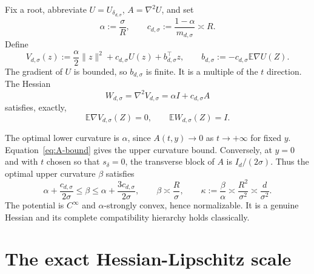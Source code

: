 \documentclass[11pt]{article}
\numberwithin{equation}{section}
\newcommand{\E}{\mathbb E}
\begin{document}
Fix a root, abbreviate $U=U_{\delta_{d,\sigma}}$, $A=\nabla^2U$, and set
\begin{equation}\label{eq:alpha-c}
 \alpha:=\frac\sigma R,\qquad
 c_{d,\sigma}:=\frac{1-\alpha}{m_{d,\sigma}}\asymp R.
\end{equation}
Define
\begin{equation}\label{eq:Vdef}
 V_{d,\sigma}(z)
 :=\frac\alpha2\|z\|^2+c_{d,\sigma}U(z)+b_{d,\sigma}^\top z,
 \qquad
 b_{d,\sigma}:=-c_{d,\sigma}\E\nabla U(Z).
\end{equation}
The gradient of $U$ is bounded, so $b_{d,\sigma}$ is finite.  It is a
multiple of the $t$ direction.  The Hessian
\begin{equation}\label{eq:Wdef}
 W_{d,\sigma}=\nabla^2V_{d,\sigma}=\alpha I+c_{d,\sigma}A
\end{equation}
satisfies, exactly,
\begin{equation}\label{eq:exact-equilibrium}
 \E\nabla V_{d,\sigma}(Z)=0,\qquad \E W_{d,\sigma}(Z)=I.
\end{equation}

The optimal lower curvature is $\alpha$, since $A(t,y)\to0$ as
$t\to+\infty$ for fixed $y$.  Equation~\eqref{eq:A-bound} gives the upper
curvature bound.  Conversely, at $y=0$ and with $t$ chosen so that
$s_\delta=0$, the transverse block of $A$ is $I_d/(2\sigma)$.  Thus the
optimal upper curvature $\beta$ satisfies
\begin{equation}\label{eq:beta-kappa}
 \alpha+\frac{c_{d,\sigma}}{2\sigma}\le\beta
 \le\alpha+\frac{3c_{d,\sigma}}{2\sigma},\qquad
 \beta\asymp\frac R\sigma,\qquad
 \kappa:=\frac\beta\alpha\asymp\frac{R^2}{\sigma^2}\asymp\frac d{\sigma^2}.
\end{equation}
The potential is $C^\infty$ and $\alpha$-strongly convex, hence normalizable.
It is a genuine Hessian and its complete compatibility hierarchy holds
classically.

\section{The exact Hessian-Lipschitz scale}\label{sec:Lip}
\end{document}
